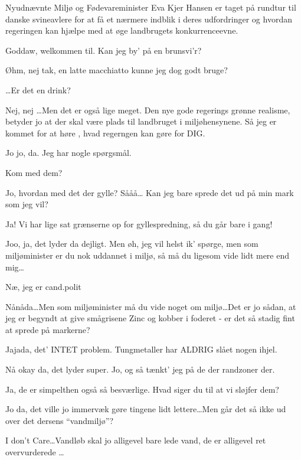 \documentclass[a4paper,11pt]{article}
\begin{document}
\begin{sketch}


Nyudnævnte Miljø og Fødevareminister Eva Kjer Hansen er taget på rundtur til danske svineavlere for at få et nærmere indblik i deres udfordringer og hvordan regeringen kan hjælpe med at øge landbrugets konkurrenceevne.


 Goddaw, welkommen til. Kan jeg by’ på en brunsvi'r?

 Øhm, nej tak, en latte macchiatto kunne jeg dog godt bruge?

\ldots Er det en drink?

Nej, nej \ldots Men det er også lige meget. Den nye gode regerings grønne realisme, betyder jo at der skal være plads til landbruget i miljøhensynene. Så jeg er kommet for at høre , hvad regerngen kan gøre for DIG.

Jo jo, da. Jeg har nogle spørgsmål.

Kom med dem?

Jo, hvordan med det der gylle? Sååå… Kan jeg bare sprede det ud på min mark som jeg vil?

 Ja! Vi har lige sat grænserne op for gyllespredning, så du går bare i gang!

Joo, ja, det lyder da dejligt. Men øh, jeg vil helst ik' spørge, men som miljøminister er du nok uddannet i miljø, så må du ligesom vide lidt mere end mig\ldots

Næ, jeg er cand.polit

Nånåda\ldots Men som miljøminister må du vide noget om miljø\ldots Det er jo sådan, at jeg er begyndt at give smågrisene Zinc og kobber i foderet - er det så stadig fint at sprede på markerne?   

Jajada, det' INTET problem. Tungmetaller har ALDRIG slået nogen ihjel. 

Nå okay da, det lyder super. Jo, og så tænkt' jeg på de der randzoner der. 

Ja, de er simpelthen også så besværlige. Hvad siger du til at vi sløjfer dem?

 Jo da, det ville jo immervæk gøre tingene lidt lettere\ldots Men går det så ikke ud over det dersens ``vandmiljø''?

 I don’t Care\ldots Vandløb skal jo alligevel bare lede vand, de er alligevel ret overvurderede \ldots


\end{sketch}
\end{document}
